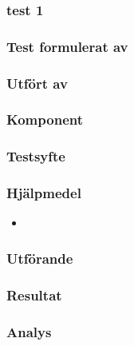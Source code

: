 \subsubsection{test 1}
\label{test1}

\setlength{\columnsep}{1cm}




\begin{multicols}{2}
\subsubsection*{Test formulerat av}


\subsubsection*{Utfört av}



\end{multicols}
\subsubsection*{Komponent}



\subsubsection*{Testsyfte}



\subsubsection*{Hjälpmedel}
\begin{itemize}
	\item 
\end{itemize}



\subsubsection*{Utförande}



\subsubsection*{Resultat}



\subsubsection*{Analys}



